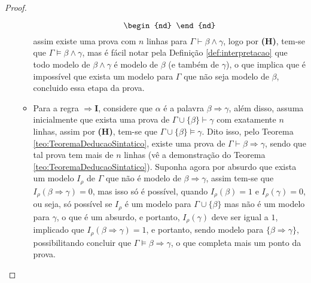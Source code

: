 \begin{proof}
\begin{itemize}
\begin{itemize}
$$\begin{nd}
      \end{nd}
      $$
      assim existe uma prova com $n$ linhas para $\Gamma \vdash \beta \land \gamma$, logo por \textbf{(H)}, tem-se que $\Gamma \vDash \beta \land \gamma$, mas é fácil notar pela Definição \ref{def:interpretacao} que todo modelo de $\beta \land \gamma$ é modelo de $\beta$ (e também de $\gamma$), o que implica que é impossível que exista um modelo para $\Gamma$ que não seja modelo de $\beta$, concluido essa etapa da prova.
      \item Para a regra \textbf{$\Rightarrow$I}, considere que $\alpha$ é a palavra $\beta \Rightarrow \gamma$, além disso, assuma inicialmente que exista uma prova de $\Gamma \cup \{\beta\} \vdash \gamma$ com exatamente $n$ linhas, assim por \textbf{(H)}, tem-se que $\Gamma \cup \{\beta\} \vDash \gamma$. Dito isso, pelo Teorema \ref{teo:TeoremaDeducaoSintatico}, existe uma prova de $\Gamma \vdash \beta \Rightarrow \gamma$, sendo que tal prova tem mais de $n$ linhas (vê a demonstração do Teorema \ref{teo:TeoremaDeducaoSintatico}). Suponha agora por absurdo que exista um modelo $I_\rho$ de $\Gamma$ que não é modelo de $\beta \Rightarrow \gamma$, assim tem-se que $I_\rho(\beta \Rightarrow \gamma) = 0$, mas isso só é possível, quando $I_\rho(\beta) = 1$ e $I_\rho(\gamma) = 0$, ou seja, só possível se $I_\rho$ é um modelo para $\Gamma \cup \{\beta\}$ mas não é um modelo para $\gamma$, o que é um absurdo, e portanto, $I_\rho(\gamma)$ deve ser igual a $1$, implicado que $I_\rho(\beta \Rightarrow \gamma) = 1$, e portanto, sendo modelo para $\{\beta \Rightarrow \gamma\}$, possibilitando concluir que $\Gamma \vDash \beta \Rightarrow \gamma$, o que completa mais um ponto da prova.
    \end{itemize}
  \end{itemize}
\end{proof}



